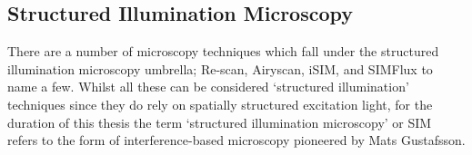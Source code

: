 \subsection{Structured Illumination Microscopy}
\label{subsec:SIM}

There are a number of microscopy techniques which fall under the structured
illumination microscopy umbrella; Re-scan\cite{de2013re}, 
Airyscan\cite{huff2015airyscan}, iSIM\cite{york2013instant,curd2015construction},
and SIMFlux\cite{cnossen2020localization} to name a few. Whilst all these can be 
considered `structured illumination' techniques since they do rely on spatially 
structured excitation light, for the duration of this thesis the term 
`structured illumination microscopy' or SIM refers to the form of 
interference-based microscopy pioneered by Mats 
Gustafsson\cite{gustafsson1999extended,gustafsson2000surpassing,gustafsson2008three}.

